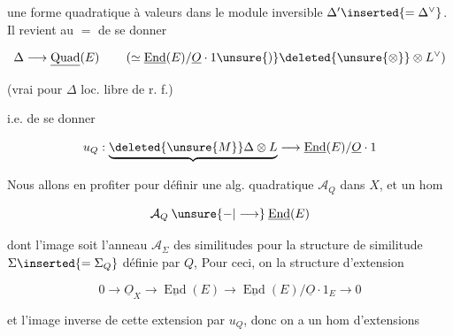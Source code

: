 
une forme quadratique à valeurs dans le module inversible $\Delta'\inserted{=\Delta^\vee}$. Il revient au $=$ de se donner

\[
\Delta\longrightarrow\underline{\operatorname{Quad}}(E)\qquad
\left(\simeq\underline{\operatorname{End}}(E)/\underline O\cdot1\unsure{)}\deleted{\unsure{\otimes}}\otimes L^\vee\right)
\]

(vrai pour  $\Delta$ loc. libre de r. f.)

i.e. de se donner

\[
u_Q:\underbrace{\deleted{\unsure{M}}\Delta\otimes L}\longrightarrow\underline{\operatorname{End}}(E)/\underline O\cdot1
\]

Nous allons en profiter pour définir une alg.  quadratique $\mathcal A_Q$ dans $X$, et un hom 

\[
\mathcal A_Q\mathbin{\unsure{-|\longrightarrow}}\underline{\operatorname{End}}(E)
\]

dont l'image soit l'anneau $\mathcal A_\Sigma$ des similitudes pour la structure de similitude $\Sigma\inserted{=\Sigma_Q}$ définie par $Q$,  Pour ceci, on  la structure d'extension

\[
0\longrightarrow\underline O_X\longrightarrow\underline{\operatorname{End}}(E)\longrightarrow\underline{\operatorname{End}}(E)/\underline O\cdot1_E\longrightarrow0
\]

et  l'image inverse de cette extension par $u_Q$, donc on a un hom d'extensions


